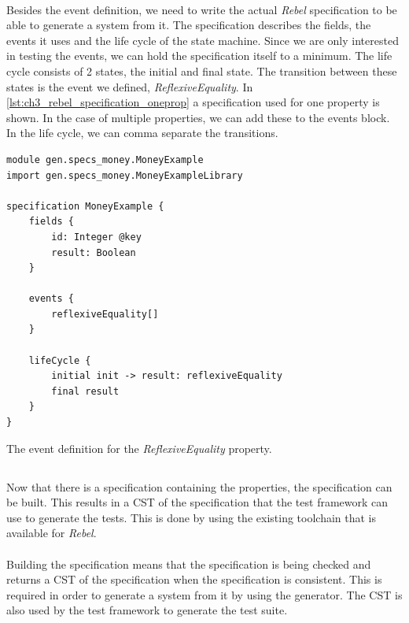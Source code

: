 \\
Besides the event definition, we need to write the actual \textit{Rebel}
specification to be able to generate a system from it. The specification
describes the fields, the events it uses and the life cycle of the state
machine. Since we are only interested in testing the events, we can hold the
specification itself to a minimum. The life cycle consists of 2 states, the
initial and final state. The transition between these states is the event we
defined, \textit{ReflexiveEquality}. In
\autoref{lst:ch3_rebel_specification_oneprop} a specification used for one
property is shown. In the case of multiple properties, we can add these to the
events block. In the life cycle, we can comma separate the transitions.
\begin{sourcecode}[!ht]
\begin{lstlisting}[language=Rebel]
module gen.specs_money.MoneyExample
import gen.specs_money.MoneyExampleLibrary

specification MoneyExample {
	fields {
        id: Integer @key
		result: Boolean
	}

	events {
		reflexiveEquality[]
	}

	lifeCycle {
		initial init -> result:	reflexiveEquality
		final result
	}
}
\end{lstlisting}
\caption{The event definition for the \textit{ReflexiveEquality} property.}
\label{lst:ch3_rebel_specification_oneprop}
\end{sourcecode}
\FloatBarrier\noindent

\subsection{\tfPhaseTwo{}}
Now that there is a specification containing the properties, the specification
can be built. This results in a CST of the specification that the test framework
can use to generate the tests. This is done by using the existing toolchain that
is available for \textit{Rebel}.\\
\\
Building the specification means that the specification is being checked and
returns a CST of the specification when the specification is consistent. This is
required in order to generate a system from it by using the generator. The CST
is also used by the test framework to generate the test suite.

